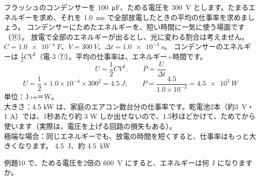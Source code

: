 \label{ph:電-9:ex10}
\begin{phreidai}[カメラのフラッシュ]
フラッシュのコンデンサーを \qty{100}{\micro F}、ためる電圧を \qty{300}{V} とします。たまるエネルギーを求め、それを \qty{1.0}{ms} で全部放電したときの平均の仕事率を求めましょう。
\phbamen
コンデンサーにためたエネルギーを、短い時間に一気に使う場面です（⑪）。
\phmushi
放電で全部のエネルギーが出るとし、光に変わる割合は考えません。
\phzu
$C=\qty{1.0e-4}{F}$、$V=\qty{300}{V}$、$\Delta t=\qty{1.0e-3}{s}$。
\phriyu
コンデンサーのエネルギーは $\tfrac12CV^2$（電-3 ⑦）。平均の仕事率は、エネルギー÷時間です。
\phtateru
\[ U=\frac12CV^2,\qquad\overline P=\frac{U}{\Delta t} \]
\phtoku
\[ U=\frac12\times1.0\times10^{-4}\times300^2=\qty{4.5}{J},\qquad\overline P=\frac{4.5}{1.0\times10^{-3}}=\qty{4.5e3}{W} \]
\phtashikame
単位：J÷s＝W。\\
大きさ：4.5 kW は、家庭のエアコン数台分の仕事率です。乾電池2本（約\qty{3}{V}・1 A）では、1秒あたり約 3 W しか出せないので、1.5秒ほどかけて、ためてから使います（実際は、電圧を上げる回路の損失もある）。\\
極端な場合：同じエネルギーでも、放電の時間を短くすると、仕事率はもっと大きくなります。
\kotae \qty{4.5}{J}、約 \qty{4.5}{kW}
\end{phreidai}
\begin{jibun}
例題10 で、ためる電圧を2倍の \qty{600}{V} にすると、エネルギーは何 J になりますか。
\end{jibun}

